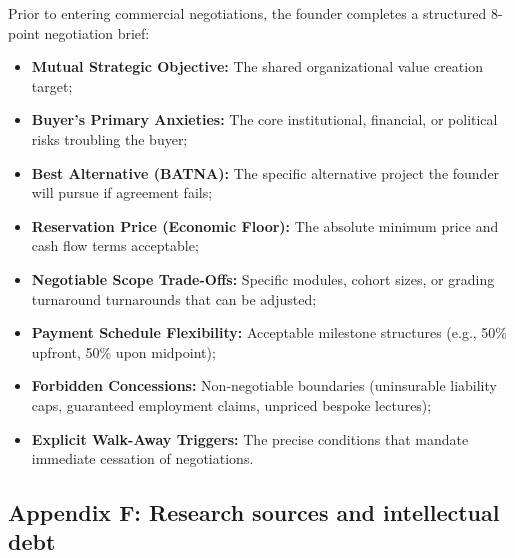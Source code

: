 Prior to entering commercial negotiations, the founder completes a structured 8-point negotiation brief:
\begin{itemize}
\item \textbf{Mutual Strategic Objective:} The shared organizational value creation target;
\item \textbf{Buyer's Primary Anxieties:} The core institutional, financial, or political risks troubling the buyer;
\item \textbf{Best Alternative (BATNA):} The specific alternative project the founder will pursue if agreement fails;
\item \textbf{Reservation Price (Economic Floor):} The absolute minimum price and cash flow terms acceptable;
\item \textbf{Negotiable Scope Trade-Offs:} Specific modules, cohort sizes, or grading turnaround turnarounds that can be adjusted;
\item \textbf{Payment Schedule Flexibility:} Acceptable milestone structures (e.g., 50\% upfront, 50\% upon midpoint);
\item \textbf{Forbidden Concessions:} Non-negotiable boundaries (uninsurable liability caps, guaranteed employment claims, unpriced bespoke lectures);
\item \textbf{Explicit Walk-Away Triggers:} The precise conditions that mandate immediate cessation of negotiations.
\end{itemize}

\subsection*{Appendix F: Research sources and intellectual debt}

